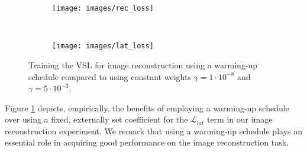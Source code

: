 \documentclass[10pt,twocolumn,letterpaper]{article}
\begin{document}
\begin{figure}[ht!]
	\centering
  \begin{subfigure}[b]{0.23\textwidth}
    \centering
    \texttt{[image: images/rec\_loss]}
    \end{subfigure}
  \,
  \begin{subfigure}[b]{0.23\textwidth}
    \centering
    \texttt{[image: images/lat\_loss]}
  \end{subfigure}
	\caption{Training the VSL for image reconstruction using a warming-up schedule compared to using constant weights $\gamma=1\cdot 10^{-8}$ and $\gamma = 5\cdot 10^{-3}$.}
  \label{fig:losscompare}
\end{figure}

Figure \ref{fig:losscompare} depicts, empirically, the benefits of employing a warming-up schedule over using a fixed, externally set coefficient for the $\mathcal{L}_{lat}$ term in our image reconstruction experiment. We remark that using a warming-up schedule plays an essential role in acquiring good performance on the image reconstruction task.
\end{document}
